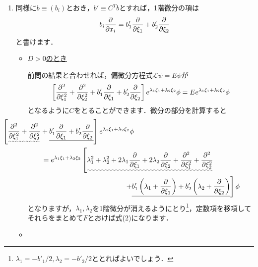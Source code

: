\documentclass[a4paper,pdflatex,ja=standard]{bxjsarticle}
\begin{document}
\begin{enumerate}
  \item 

  同様に$b\equiv(b_i)$とおき，$b'\equiv C^{T}b$とすれば，1階微分の項は
  \begin{equation}
    b_i\pdv{}{x_i}
    =
    b'_1\pdv{}{\xi_1}
    +
    b'_2\pdv{}{\xi_2}
  \end{equation}
  と書けます．

  \begin{itemize}

    \item 

    \uline{$D>0$のとき}

    前問の結果と合わせれば，偏微分方程式$\mathcal{L}\psi=E\psi$が
    \begin{equation}
      \left[  
        \pdv[2]{}{\xi_1}
        +
        \pdv[2]{}{\xi_2}
        +        
        b'_1\pdv{}{\xi_1}
        +
        b'_2\pdv{}{\xi_2}
      \right]
      e^{\lambda_1\xi_1+\lambda_2\xi_2}\phi
      =
      E
      e^{\lambda_1\xi_1+\lambda_2\xi_2}\phi
    \end{equation}
    となるように$C$をとることができます．微分の部分を計算すると
    \begin{align}     
      &\hspace{-2cm}
      \left[  
        \uwave{
          \pdv[2]{}{\xi_1}
          +
          \pdv[2]{}{\xi_2}
        }
        +        
        \uline{
          b'_1\pdv{}{\xi_1}
          +
          b'_2\pdv{}{\xi_2}
        }
      \right]
      e^{\lambda_1\xi_1+\lambda_2\xi_2}
      \phi
      \nonumber
      \\
      &=
      e^{\lambda_1\xi_1+\lambda_2\xi_2}
      \left[  
        \uwave{
          \lambda_1^2+\lambda_2^2
          +
          2\lambda_1\pdv{}{\xi_1}+2\lambda_2\pdv{}{\xi_2}
          +
          \pdv[2]{}{\xi_1}
          +
          \pdv[2]{}{\xi_2}
        }
      \right.
      \nonumber
      \\
      &\hspace{4.2cm}
      \left.
        +
        \uline{
          b'_1\left( \lambda_1+\pdv{}{\xi_1} \right)
          +
          b'_2\left( \lambda_2+\pdv{}{\xi_2} \right)
        }
      \right]
      \phi
      \label{diff_term}
    \end{align}
    となりますが，$\lambda_1,\lambda_2$を1階微分が消えるようにとり\footnote{
      $\lambda_1=-b'_1/2,\lambda_2=-b'_2/2$ととればよいでしょう．
    }，定数項を移項してそれらをまとめて$F$とおけば式(2)になります．


    \item 


\end{itemize}
\end{enumerate}
\end{document}
